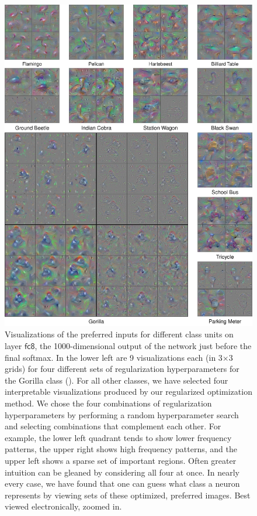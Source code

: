\documentclass{article}
\newcommand{\layer}[1]{\ensuremath{\mathsf{#1}\xspace}}
\begin{document}
\begin{figure}[!ht]
\vskip -0.2in
\begin{center}
\centerline{\includegraphics[width=.95\linewidth]{fc8-visualized.jpg}}
\vskip -0.2in
\caption{Visualizations of the preferred inputs for different class units on layer \layer{fc8}, the 1000-dimensional output of the network just before the final softmax. In the lower left are 9 visualizations each (in 3$\times$3 grids) for four different sets of regularization hyperparameters for the Gorilla class (). For all other classes, we have selected four interpretable visualizations produced by our regularized optimization method. We chose the four combinations of regularization hyperparameters by performing a random hyperparameter search and selecting combinations that complement each other. For example, the lower left quadrant tends to show lower frequency patterns, the upper right shows high frequency patterns, and the upper left shows a sparse set of important regions.  Often greater intuition can be gleaned by considering all four at once. In nearly every case, we have found that one can guess what class a neuron represents by viewing sets of these optimized, preferred images. Best viewed electronically, zoomed in.
}
\end{center}
\vskip -0.9in
\end{figure}
\end{document}
